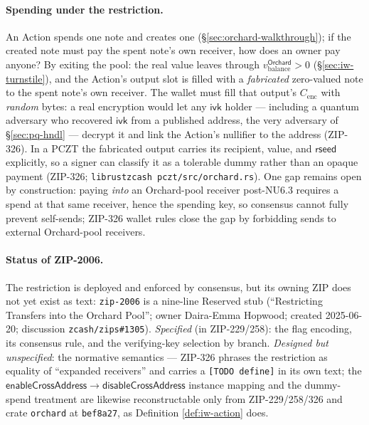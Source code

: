 \documentclass[11pt,a4paper]{article}
\theoremstyle{definition}
\newcommand{\ivk}{\ensuremath{\mathsf{ivk}}}
\begin{document}
\paragraph{Spending under the restriction.} An Action spends one note and
creates one (\S\ref{sec:orchard-walkthrough}); if the created note must pay
the spent note's own receiver, how does an owner pay anyone? By exiting the
pool: the real value leaves through
$v_{\mathrm{balance}}^{\mathsf{Orchard}} > 0$ (\S\ref{sec:iw-turnstile}),
and the Action's output slot is filled with a \emph{fabricated} zero-valued
note to the spent note's own receiver. The wallet must fill that output's
$C_{\mathrm{enc}}$ with \emph{random} bytes: a real encryption would let any
$\ivk$ holder --- including a quantum adversary who recovered $\ivk$ from a
published address, the very adversary of \S\ref{sec:pq-hndl} --- decrypt it
and link the Action's nullifier to the address (ZIP-326). In a PCZT the
fabricated output carries its recipient, value, and $\mathsf{rseed}$
explicitly, so a signer can classify it as a tolerable dummy rather than an
opaque payment (ZIP-326; \texttt{librustzcash pczt/src/orchard.rs}). One
gap remains open by construction: paying \emph{into} an Orchard-pool
receiver post-NU6.3 requires a spend at that same receiver, hence the
spending key, so consensus cannot fully prevent self-sends; ZIP-326 wallet
rules close the gap by forbidding sends to external Orchard-pool receivers.

\paragraph{Status of ZIP-2006.} The restriction is deployed and enforced by
consensus, but its owning ZIP does not yet exist as text: \texttt{zip-2006}
is a nine-line Reserved stub (``Restricting Transfers into the Orchard
Pool''; owner Daira-Emma Hopwood; created 2025-06-20; discussion
\texttt{zcash/zips\#1305}). \emph{Specified} (in ZIP-229/258): the flag
encoding, its consensus rule, and the verifying-key selection by branch.
\emph{Designed but unspecified}: the normative semantics --- ZIP-326 phrases
the restriction as equality of ``expanded receivers'' and carries a
\texttt{[TODO define]} in its own text; the
$\mathsf{enableCrossAddress} \to \mathsf{disableCrossAddress}$ instance
mapping and the dummy-spend treatment are likewise reconstructable only from
ZIP-229/258/326 and crate \texttt{orchard} at \texttt{bef8a27}, as Definition
\ref{def:iw-action} does.
\end{document}
